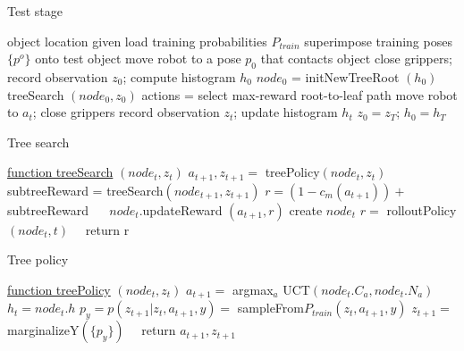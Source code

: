 \documentclass[letterpaper, 10 pt, conference]{ieeeconf}  %
\begin{document}
\begin{algorithm}[htbp]
\caption{Test stage}
\label{alg:test}
object location given\;
load training probabilities $P_{train}$\;
  superimpose training poses $\{p^o\}$ onto test object\;
move robot to a pose $p_0$ that contacts object\;
close grippers; record observation $z_0$; compute histogram $h_0$\;
{
  $node_0$ = initNewTreeRoot $(h_0)$\;
  {
    treeSearch $(node_0, z_0)$\;
  }
  actions = select max-reward root-to-leaf path\;  \label{alg:test_selpath}
  {
    move robot to $a_t$; close grippers\;
    record observation $z_t$; update histogram $h_t$\;
  }
  $z_0 = z_T$; $h_0 = h_T$\;
}
\end{algorithm}

\begin{algorithm}
\caption{Tree search}
\label{alg:tree_search}
\underline{function treeSearch} $(node_t, z_t)$\;
  { \label{alg:ts_exists}
    $a_{t+1}, z_{t+1} =$ treePolicy$(node_t, z_t)$\; \label{alg:ts_tp}
    subtreeReward = treeSearch$(node_{t+1}, z_{t+1})$\; \label{alg:ts_recursive}
    $r = (1 - c_m (a_{t+1})) +$ subtreeReward $\quad$    \label{alg:ts_reward}
    $node_t$.updateReward $(a_{t+1}, r)$\;  \label{alg:ts_backpropagate}
  }
  {
    create $node_t$\;  \label{alg:ts_node}
    $r =$ rolloutPolicy $(node_t, t) \quad$   \label{alg:ts_rollout}
  }
  return r\;
\end{algorithm}

\begin{algorithm}
\caption{Tree policy}
\label{alg:tree_policy}
\underline{function treePolicy} $(node_t, z_t)$\;
  $a_{t+1} =$ argmax$_a$ UCT$(node_t.C_a, node_t.N_a) $ 
  $h_t = node_t.h$\;
  {
    $p_y = p(z_{t+1} | z_t, a_{t+1}, y) =$ sampleFrom$P_{train} (z_t, a_{t+1}, y)$\;
  }
  $z_{t+1} = $ marginalizeY$(\{p_y\}) \quad$  
  return $a_{t+1}, z_{t+1}$\;
\end{algorithm}
\end{document}
